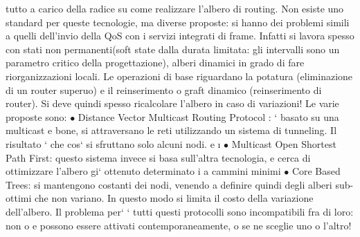 \documentclass[a4paper,12pt]{article}
\begin{document}
tutto a carico della radice su come realizzare l'albero di routing.
Non esiste uno standard per queste tecnologie, ma diverse proposte: si hanno
dei problemi simili a quelli dell'invio della QoS con i servizi integrati di frame.
Infatti si lavora spesso con stati non permanenti(soft state dalla durata limitata:
gli intervalli sono un parametro critico della progettazione), alberi dinamici
in grado di fare riorganizzazioni locali. Le operazioni di base riguardano la
potatura (eliminazione di un router superuo) e il reinserimento o graft dinamico
(reinserimento di router). Si deve quindi spesso ricalcolare l'albero in caso di
variazioni! Le varie proposte sono:
$\bullet$ Distance Vector Multicast Routing Protocol : ` basato su una multicast
e
bone, si attraversano le reti utilizzando un sistema di tunneling. Il risultato
` che cos` si sfruttano solo alcuni nodi.
e
\i{}
$\bullet$ Multicast Open Shortest Path First: questo sistema invece si basa sull'altra tecnologia, e cerca di
ottimizzare l'albero gi` ottenuto determinato i
a
cammini minimi
$\bullet$ Core Based Trees: si mantengono costanti dei nodi, venendo a definire
quindi degli alberi sub-ottimi che non variano. In questo modo si limita il
costo della variazione dell'albero.
Il problema per` ` tutti questi protocolli sono incompatibili fra di loro: non
o e
possono essere attivati contemporaneamente, o se ne sceglie uno o l'altro!
\end{document}
